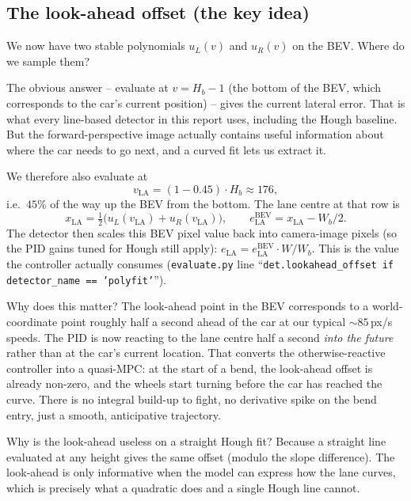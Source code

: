 \subsection{The look-ahead offset (the key idea)}

We now have two stable polynomials $u_L(v)$ and $u_R(v)$ on the BEV.
Where do we sample them?

The obvious answer -- evaluate at $v=H_b-1$ (the bottom of the BEV,
which corresponds to the car's current position) -- gives the current
lateral error. That is what every line-based detector in this report
uses, including the Hough baseline. But the forward-perspective image
actually contains useful information about where the car needs to go
next, and a curved fit lets us extract it.

We therefore also evaluate at
\[
v_{\text{LA}} = (1-0.45)\cdot H_b \approx 176,
\]
i.e.\ $45\%$ of the way up the BEV from the bottom. The lane centre
at that row is
\[
x_{\text{LA}} = \tfrac{1}{2}\bigl(u_L(v_{\text{LA}}) + u_R(v_{\text{LA}})\bigr),\qquad
e_{\text{LA}}^{\text{BEV}} = x_{\text{LA}} - W_b/2.
\]
The detector then scales this BEV pixel value back into camera-image
pixels (so the PID gains tuned for Hough still apply):
$e_{\text{LA}} = e_{\text{LA}}^{\text{BEV}}\cdot W/W_b$. This is the
value the controller actually consumes (\texttt{evaluate.py} line
``\texttt{det.lookahead\_offset if detector\_name == 'polyfit'}'').

Why does this matter? The look-ahead point in the BEV corresponds to
a world-coordinate point roughly half a second ahead of the car at our
typical $\sim 85$\,px/s speeds. The PID is now reacting to the lane
centre half a second \emph{into the future} rather than at the car's
current location. That converts the otherwise-reactive controller
into a quasi-MPC: at the start of a bend, the look-ahead offset is
already non-zero, and the wheels start turning before the car has
reached the curve. There is no integral build-up to fight, no
derivative spike on the bend entry, just a smooth, anticipative
trajectory.

\begin{intuition}
Why is the look-ahead useless on a straight Hough fit? Because a
straight line evaluated at any height gives the same offset (modulo
the slope difference). The look-ahead is only informative when the
model can express how the lane curves, which is precisely what a
quadratic does and a single Hough line cannot.
\end{intuition}

